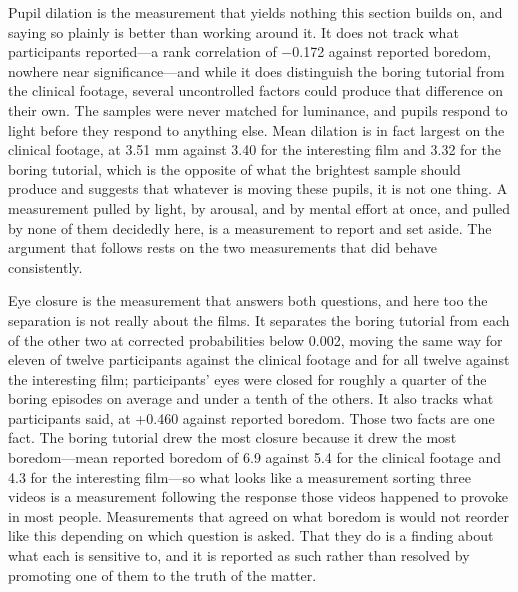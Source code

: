 Pupil dilation is the measurement that yields nothing this section builds on, and saying so
plainly is better than working around it. It does not track what participants reported---a rank
correlation of $-$0.172 against reported boredom, nowhere near significance---and while it does
distinguish the boring tutorial from the clinical footage, several uncontrolled factors could
produce that difference on their own. The samples were never matched for luminance, and pupils
respond to light before they respond to anything else. Mean dilation is in fact largest on the
clinical footage, at 3.51 mm against 3.40 for the interesting film and 3.32 for the boring
tutorial, which is the opposite of what the brightest sample should produce and suggests that
whatever is moving these pupils, it is not one thing. A measurement pulled by light, by arousal,
and by mental effort at once, and pulled by none of them decidedly here, is a measurement to
report and set aside. The argument that follows rests on the two measurements that did behave
consistently.

Eye closure is the measurement that answers both questions, and here too the separation is not
really about the films. It separates the boring tutorial from each of the other two at corrected
probabilities below 0.002, moving the same way for eleven of twelve participants against the
clinical footage and for all twelve against the interesting film; participants' eyes were closed
for roughly a quarter of the boring episodes on average and under a tenth of the others. It also
tracks what participants said, at +0.460 against reported boredom. Those two facts are one fact.
The boring tutorial drew the most closure because it drew the most boredom---mean reported
boredom of 6.9 against 5.4 for the clinical footage and 4.3 for the interesting film---so what
looks like a measurement sorting three videos is a measurement following the response those
videos happened to provoke in most people. Measurements that agreed on what boredom is would not
reorder like this depending on which question is asked. That they do is a finding about what each
is sensitive to, and it is reported as such rather than resolved by promoting one of them to the
truth of the matter.

